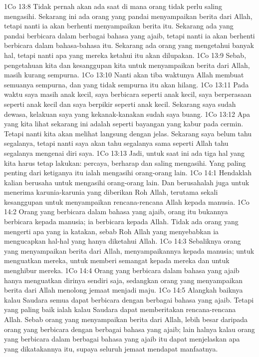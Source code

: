 1Co 13:8  Tidak pernah akan ada saat di mana orang tidak perlu saling mengasihi. Sekarang ini ada orang yang pandai menyampaikan berita dari Allah, tetapi nanti ia akan berhenti menyampaikan berita itu. Sekarang ada yang pandai berbicara dalam berbagai bahasa yang ajaib, tetapi nanti ia akan berhenti berbicara dalam bahasa-bahasa itu. Sekarang ada orang yang mengetahui banyak hal, tetapi nanti apa yang mereka ketahui itu akan dilupakan.
1Co 13:9  Sebab, pengetahuan kita dan kesanggupan kita untuk menyampaikan berita dari Allah, masih kurang sempurna.
1Co 13:10  Nanti akan tiba waktunya Allah membuat semuanya sempurna, dan yang tidak sempurna itu akan hilang.
1Co 13:11  Pada waktu saya masih anak kecil, saya berbicara seperti anak kecil, saya berperasaan seperti anak kecil dan saya berpikir seperti anak kecil. Sekarang saya sudah dewasa, kelakuan saya yang kekanak-kanakan sudah saya buang.
1Co 13:12  Apa yang kita lihat sekarang ini adalah seperti bayangan yang kabur pada cermin. Tetapi nanti kita akan melihat langsung dengan jelas. Sekarang saya belum tahu segalanya, tetapi nanti saya akan tahu segalanya sama seperti Allah tahu segalanya mengenai diri saya.
1Co 13:13  Jadi, untuk saat ini ada tiga hal yang kita harus tetap lakukan: percaya, berharap dan saling mengasihi. Yang paling penting dari ketiganya itu ialah mengasihi orang-orang lain.
1Co 14:1  Hendaklah kalian berusaha untuk mengasihi orang-orang lain. Dan berusahalah juga untuk menerima karunia-karunia yang diberikan Roh Allah, terutama sekali kesanggupan untuk menyampaikan rencana-rencana Allah kepada manusia.
1Co 14:2  Orang yang berbicara dalam bahasa yang ajaib, orang itu bukannya berbicara kepada manusia; ia berbicara kepada Allah. Tidak ada orang yang mengerti apa yang ia katakan, sebab Roh Allah yang menyebabkan ia mengucapkan hal-hal yang hanya diketahui Allah.
1Co 14:3  Sebaliknya orang yang menyampaikan berita dari Allah, menyampaikannya kepada manusia; untuk menguatkan mereka, untuk memberi semangat kepada mereka dan untuk menghibur mereka.
1Co 14:4  Orang yang berbicara dalam bahasa yang ajaib hanya menguatkan dirinya sendiri saja, sedangkan orang yang menyampaikan berita dari Allah menolong jemaat menjadi maju.
1Co 14:5  Alangkah baiknya kalau Saudara semua dapat berbicara dengan berbagai bahasa yang ajaib. Tetapi yang paling baik ialah kalau Saudara dapat memberitakan rencana-rencana Allah. Sebab orang yang menyampaikan berita dari Allah, lebih besar daripada orang yang berbicara dengan berbagai bahasa yang ajaib; lain halnya kalau orang yang berbicara dalam berbagai bahasa yang ajaib itu dapat menjelaskan apa yang dikatakannya itu, supaya seluruh jemaat mendapat manfaatnya.
